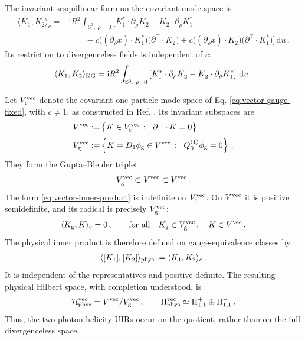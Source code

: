 \documentclass{SciPost}
\begin{document}
The invariant sesquilinear form on the covariant mode space is \cite{takVec}
\begin{align}\label{eq:vector-inner-product}
    \langle K_1,K_2\rangle_c
    ={}&\mathrm{i}R^2
    \int_{\mathbb S^3,\;\rho=0}
    \Big[
        {K_1^\ast}\cdot\partial_\rho K^{}_2
        -K^{}_2\cdot\partial_\rho{K_1^\ast}
        \nonumber \\[3pt]
        &\qquad
        -c\bigl((\partial_\rho x)\cdot{K_1^\ast}\bigr)
          \bigl(\partial^{\top}\cdot K^{}_2\bigr)
        +c\bigl((\partial_\rho x)\cdot K^{}_2\bigr)
          \bigl(\partial^{\top}\cdot{K_1^\ast}\bigr)
    \Big]\,\mathrm{d}u \,.
\end{align}
Its restriction to divergenceless fields is independent of $c$:
\begin{align}
    \langle K_1,K_2\rangle_{\rm KG}
    =\mathrm{i}R^2
    \int_{\mathbb S^3,\;\rho=0}
    \left[
        {K_1^\ast}\cdot\partial_\rho K^{}_2
        -K^{}_2\cdot\partial_\rho{K_1^\ast}
    \right]\,\mathrm{d}u \,.
\end{align}

Let $V_{\rm c}^{\rm vec}$ denote the covariant one-particle mode space of Eq. \eqref{eq:vector-gauge-fixed}, with $c\neq1$, as constructed in Ref. \cite{takVec}. Its invariant subspaces are
\begin{align}
    V^{\rm vec}
    :=&
    \left\{
        K\in V_{\rm c}^{\rm vec}
        \;\colon\;\;
        \partial^{\top}\cdot K=0
    \right\} \,,
     \\[3pt]
    V_{\rm g}^{\rm vec}
    :=&
    \left\{
        K=D_1\phi_{\rm g}\in V^{\rm vec}
        \;\colon\;\;
        Q^{(1)}_0\phi_{\rm g}=0
    \right\} \,.
\end{align}
They form the Gupta--Bleuler triplet
\begin{align}
    V_{\rm g}^{\rm vec}
    \subset V^{\rm vec}
    \subset V_{\rm c}^{\rm vec} \,.
\end{align}
The form \eqref{eq:vector-inner-product} is indefinite on $V_{\rm c}^{\rm vec}$. On $V^{\rm vec}$ it is positive semidefinite, and its radical is precisely $V_{\rm g}^{\rm vec}$:
\begin{align}
    \langle K_{\rm g},K\rangle_c=0 \,,
    \qquad
    \text{for all}\quad
    K_{\rm g}\in V_{\rm g}^{\rm vec} \,,
    \quad K\in V^{\rm vec} \,.
\end{align}
The physical inner product is therefore defined on gauge-equivalence classes by
\begin{align}
    \langle[K_1],[K_2]\rangle_{\rm phys}
    :=\langle K_1,K_2\rangle_c \,.
\end{align}
It is independent of the representatives and positive definite. The resulting physical Hilbert space, with completion understood, is
\begin{align}
    {\cal H}_{\rm phys}^{\rm vec}
    =V^{\rm vec}/V_{\rm g}^{\rm vec} \,,
    \qquad
    \Pi_{\rm phys}^{\rm vec}
    \simeq\Pi_{1,1}^{+}\oplus\Pi_{1,1}^{-} \,.
\end{align}
Thus, the two-photon helicity UIRs occur on the quotient, rather than on the full divergenceless space.
\end{document}
